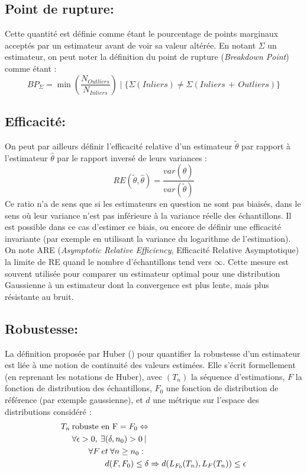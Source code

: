 \subsection{Point de rupture:}
Cette quantité est définie comme étant le pourcentage de points marginaux acceptés par un estimateur avant de voir sa valeur altérée. En notant $\Sigma$ un estimateur, on peut noter la définition du point de rupture (\emph{Breakdown Point}) comme étant : \\
\begin{equation}
BP_{\Sigma} = \min(\frac{N_{Outliers}}{N_{Inliers}}) \; | \; \{\Sigma (Inliers) \neq \Sigma(Inliers\, + \,Outliers) \} 
\end{equation}

\subsection{Efficacité:}
On peut par ailleurs définir l'efficacité relative d'un estimateur $\tilde{\theta}$ par rapport à l'estimateur $\hat{\theta}$ par le rapport inversé de leurs variances :
\begin{equation} \label{eq:ch4_ARE}
RE \left( \tilde{\theta}, \hat{\theta}\right)  = \frac{var(\hat{\theta})} {var(\tilde{\theta})}
\end{equation}
Ce ratio n'a de sens que si les estimateurs en question ne sont pas biaisés, dans le sens où leur variance n'est pas inférieure à la variance réelle des échantillons. Il est possible dans ce cas d'estimer ce biais, ou encore de définir une efficacité invariante (par exemple en utilisant la variance du logarithme de l'estimation). On note ARE (\emph{Asymptotic Relative Efficiency}, Efficacité Relative Asymptotique) la limite de RE quand le nombre d'échantillons tend vers $\infty$. Cette mesure est souvent utilisée pour comparer un estimateur optimal pour une distribution Gaussienne à un estimateur dont la convergence est plus lente, mais plus résistante au bruit.

\subsection{Robustesse:}
La définition proposée par Huber (\cite{Huber1981}) pour quantifier la robustesse d'un estimateur est liée à une notion de continuité des valeurs estimées. Elle s'écrit formellement (en reprenant les notations de Huber), avec $(T_n)$ la séquence d'estimations, $F$ la fonction de distribution des échantillons, $F_0$ une fonction de distribution de référence (par exemple gaussienne), et $d$ une métrique sur l'espace des distributions considéré : 
\begin{align}
	\begin{split}
		T_n \:& \textnormal{robuste en F} = F_0 \Leftrightarrow \\
		& \forall \epsilon > 0, \:  \exists (\delta, n_0) > 0 \: | \\
		& \qquad	\forall F \:  et \:  \forall n \geq n_0 : \\
		& \qquad \qquad	d(F,F_0) \leq \delta \Rightarrow d(L_{F_0}(T_n), L_{F}(T_n)) \leq \epsilon
	\end{split}
\end{align}

